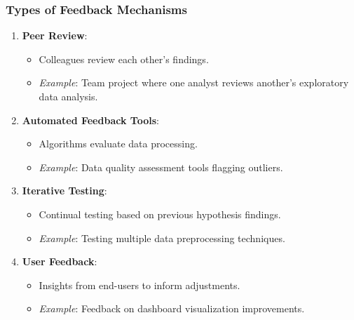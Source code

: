 \documentclass[aspectratio=169]{beamer}
\begin{document}
\begin{frame}[fragile]
    \frametitle{Types of Feedback Mechanisms}
    \begin{enumerate}
        \item \textbf{Peer Review}:
        \begin{itemize}
            \item Colleagues review each other's findings.
            \item \textit{Example}: Team project where one analyst reviews another’s exploratory data analysis.
        \end{itemize}
        
        \item \textbf{Automated Feedback Tools}:
        \begin{itemize}
            \item Algorithms evaluate data processing.
            \item \textit{Example}: Data quality assessment tools flagging outliers.
        \end{itemize}
        
        \item \textbf{Iterative Testing}:
        \begin{itemize}
            \item Continual testing based on previous hypothesis findings.
            \item \textit{Example}: Testing multiple data preprocessing techniques.
        \end{itemize}
        
        \item \textbf{User Feedback}:
        \begin{itemize}
            \item Insights from end-users to inform adjustments.
            \item \textit{Example}: Feedback on dashboard visualization improvements.
        \end{itemize}
    \end{enumerate}
\end{frame}
\end{document}
